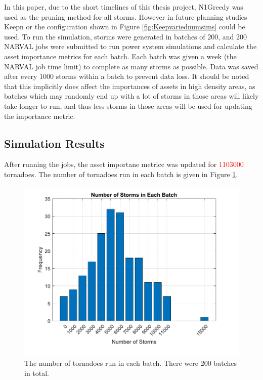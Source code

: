 \documentclass[12pt]{article}
\begin{document}
In this paper, due to the short timelines of this thesis project, N1Greedy was used as the pruning method for all storms. However in future planning studies Keepn or the configuration shown in Figure \ref{fig:Keepvariednumsims} could be used. To run the simulation, storms were generated in batches of 200, and 200 NARVAL jobs were submitted to run power system simulations and calculate the asset importance metrics for each batch. Each batch was given a week (the NARVAL job time limit) to complete as many storms as possible. Data was saved after every 1000 storms within a batch to prevent data loss. It should be noted that this implicitly does affect the importances of assets in high density areas, as batches which may randomly end up with a lot of storms in those areas will likely take longer to run, and thus less storms in those areas will be used for updating the importance metric.

\subsection{Simulation Results}
After running the jobs, the asset importane metricc was updated for \textcolor{red}{1103000} tornadoes. The number of tornadoes run in each batch is given in Figure \ref{fig:numsimsperbatch}. 

\begin{figure}[ht]
    \centering %
    \includegraphics[scale = 0.6]{numsimsperbatch.pdf}
    \caption[Number of tornadoes run in each batch]{The number of tornadoes run in each batch. There were 200 batches in total.}
    \label{fig:numsimsperbatch}
\end{figure}
\end{document}
